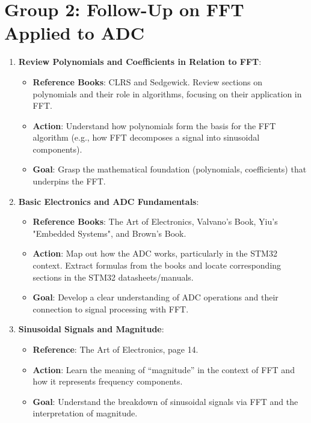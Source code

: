 \documentclass{article}
\begin{document}
\section*{Group 2: Follow-Up on FFT Applied to ADC}

\begin{enumerate}
    \item \textbf{Review Polynomials and Coefficients in Relation to FFT}:
    \begin{itemize}
        \item \textbf{Reference Books}: CLRS and Sedgewick. Review sections on polynomials and their role in algorithms, focusing on their application in FFT.
        \item \textbf{Action}: Understand how polynomials form the basis for the FFT algorithm (e.g., how FFT decomposes a signal into sinusoidal components).
        \item \textbf{Goal}: Grasp the mathematical foundation (polynomials, coefficients) that underpins the FFT.
    \end{itemize}
    
    \item \textbf{Basic Electronics and ADC Fundamentals}:
    \begin{itemize}
        \item \textbf{Reference Books}: The Art of Electronics, Valvano’s Book, Yiu’s "Embedded Systems", and Brown’s Book.
        \item \textbf{Action}: Map out how the ADC works, particularly in the STM32 context. Extract formulas from the books and locate corresponding sections in the STM32 datasheets/manuals.
        \item \textbf{Goal}: Develop a clear understanding of ADC operations and their connection to signal processing with FFT.
    \end{itemize}

    \item \textbf{Sinusoidal Signals and Magnitude}:
    \begin{itemize}
        \item \textbf{Reference}: The Art of Electronics, page 14.
        \item \textbf{Action}: Learn the meaning of “magnitude” in the context of FFT and how it represents frequency components.
        \item \textbf{Goal}: Understand the breakdown of sinusoidal signals via FFT and the interpretation of magnitude.
    \end{itemize}


\end{enumerate}
\end{document}
